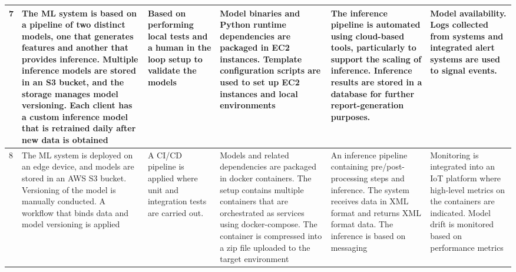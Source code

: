 \begin{table*}
\begin{tabular}{p{0.3cm}p{3.2cm}p{2.5cm}p{3.2cm}p{3cm}p{2.5cm}}
    7 & The ML system is based on a pipeline of two distinct models, one that generates features and another that provides inference. Multiple inference models are stored in an S3 bucket, and the storage manages model versioning. Each client has a custom inference model that is retrained daily after new data is obtained & Based on performing local tests and a human in the loop setup to validate the models & Model binaries and Python runtime dependencies are packaged in EC2 instances. Template configuration scripts are used to set up EC2 instances and local environments & The inference pipeline is automated using cloud-based tools, particularly to support the scaling of inference. Inference results are stored in a database for further report-generation purposes. & Model availability. Logs collected from systems and integrated alert systems are used to signal events. \\
    \midrule[0.01pt]

    8 & The ML system is deployed on an edge device, and models are stored in an AWS S3 bucket. Versioning of the model is manually conducted. A workflow that binds data and model versioning is applied & A CI/CD pipeline is applied where unit and integration tests are carried out. & Models and related dependencies are packaged in docker containers. The setup contains multiple containers that are orchestrated as services using docker-compose. The container is compressed into a zip file uploaded to the target environment & An inference pipeline containing pre/post-processing steps and inference. The system receives data in XML format and returns XML format data. The inference is based on messaging & Monitoring is integrated into an IoT platform where high-level metrics on the containers are indicated. Model drift is monitored based on performance metrics \\
    \hline
    \end{tabular}
    \label{tab: summary of cases}
\end{table*}
